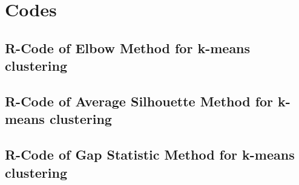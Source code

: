 \lstset{
  language=C, %
  basicstyle=\ttfamily,
  numbers=left,
  numberstyle=\footnotesize,
  stepnumber=1,
  numbersep=2.0mm}

\chapter{Codes}\label{ch:codes}

\section{R-Code of Elbow Method for k-means clustering}


\newpage

\section{R-Code of Average Silhouette Method for k-means clustering}


\newpage

\section{R-Code of Gap Statistic Method for k-means clustering}



\endinput
